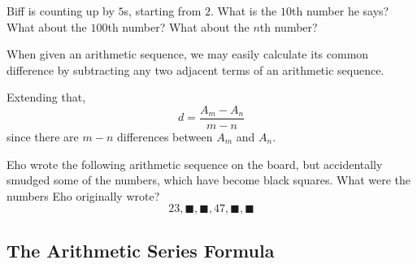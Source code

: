 \begin{exercise}
    Biff is counting up by $5$s, starting from $2$. What is the $10$th number he says? What about the $100$th number? What about the $n$th number?
\end{exercise}

When given an arithmetic sequence, we may easily calculate its common difference by subtracting any two adjacent terms of an arithmetic sequence.

Extending that, 
\[d=\frac{A_m-A_n}{m-n}\]
since there are $m-n$ differences between $A_m$ and $A_n$.

\begin{exercise}
    Eho wrote the following arithmetic sequence on the board, but accidentally smudged some of the numbers, which have become black squares. What were the numbers Eho originally wrote?
    \[23,\blacksquare,\blacksquare,47,\blacksquare,\blacksquare\]
\end{exercise}

\subsection{The Arithmetic Series Formula}


